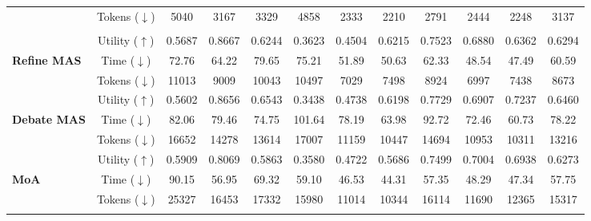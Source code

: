 \begin{table}[!t]
{\begin{tabular}{l|c|ccc|ccc|ccc|c}
        \cellcolor{orange!7}
        & Tokens ($\downarrow$) & 5040 & 3167 & 3329 & 4858 & 2333 & 2210 & 2791 & 2444 & 2248 & 3137\\

        \addlinespace[-0.4ex] \midrule \addlinespace[-0.000ex]
        \rowcolor{gray!16}
        \multicolumn{12}{c}{
            \rule{0pt}{1.1em}
            \textbf{\textit{Multi-Agent Setting}}
            \rule[-0.3em]{0pt}{1.1em}
        } \\
        [-0.4ex]\midrule\addlinespace[-0.000ex]

        \cellcolor{yellow!7}
        & Utility ($\uparrow$)   & 0.5687 & 0.8667 & 0.6244 & 0.3623 & 0.4504 & 0.6215 & 0.7523 & 0.6880 & 0.6362 & 0.6294\\
        \cellcolor{yellow!7}\textbf{Refine MAS \citeyearpar{DBLP:conf/nips/MadaanTGHGW0DPY23}}
        & Time ($\downarrow$)  & 72.76 & 64.22 & 79.65 & 75.21 & 51.89 & 50.63 & 62.33 & 48.54 & 47.49 & 60.59\\
        \cellcolor{yellow!7}
        & Tokens ($\downarrow$) & 11013 & 9009 & 10043 & 10497 & 7029 & 7498 & 8924 & 6997 & 7438 & 8673\\
        [-0.4ex]\midrule\addlinespace[-0.000ex]

        \cellcolor{green!7}
        & Utility ($\uparrow$)   & 0.5602 & 0.8656 & 0.6543 & 0.3438 & 0.4738 & 0.6198 & 0.7729 & 0.6907 & 0.7237 & 0.6460\\
        \cellcolor{green!7}\textbf{Debate MAS \citeyearpar{DBLP:conf/icml/Du00TM24}}
        & Time ($\downarrow$)  & 82.06 & 79.46 & 74.75 & 101.64 & 78.19 & 63.98 & 92.72 & 72.46 & 60.73 & 78.22\\
        \cellcolor{green!7}
        & Tokens ($\downarrow$) & 16652 & 14278 & 13614 & 17007 & 11159 & 10447 & 14694 & 10953 & 10311 & 13216\\
        [-0.4ex]\midrule\addlinespace[-0.000ex]

        \cellcolor{teal!7}
        & Utility ($\uparrow$)   & 0.5909 & 0.8069 & 0.5863 & 0.3580 & 0.4722 & 0.5686 & 0.7499 & 0.7004 & 0.6938 & 0.6273\\
        \cellcolor{teal!7}\textbf{MoA \citeyearpar{DBLP:conf/iclr/WangWAZZ25}}
        & Time ($\downarrow$)  & 90.15 & 56.95 & 69.32 & 59.10 & 46.53 & 44.31 & 57.35 & 48.29 & 47.34 & 57.75\\
        \cellcolor{teal!7}
        & Tokens ($\downarrow$) & 25327 & 16453 & 17332 & 15980 & 11014 & 10344 & 16114 & 11690 & 12365 & 15317\\
        [-0.4ex]\midrule\addlinespace[-0.000ex]


\end{tabular}}
\end{table}
